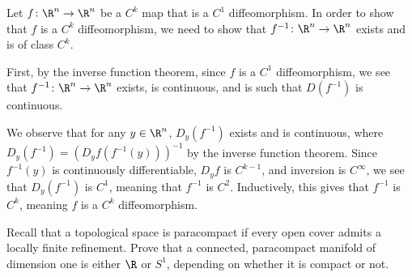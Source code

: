 \documentclass[10pt]{mypackage}
\begin{document}
\begin{solution}
  Let $f\colon \R^{n}\rightarrow \R^{n}$ be a $C^{k}$ map that is a $C^{1}$ diffeomorphism. In order to show that $f$ is a $C^{k}$ diffeomorphism, we need to show that $f^{-1}\colon \R^{n}\rightarrow \R^{n}$ exists and is of class $C^{k}$.\newline

  First, by the inverse function theorem, since $f$ is a $C^{1}$ diffeomorphism, we see that $f^{-1}\colon \R^{n}\rightarrow \R^{n}$ exists, is continuous, and is such that $D\left( f^{-1} \right)$ is continuous.\newline

  We observe that for any $y\in \R^{n}$, $D_y\left( f^{-1} \right)$ exists and is continuous, where $D_y\left( f^{-1} \right) = \left( D_yf\left( f^{-1}(y) \right) \right)^{-1}$ by the inverse function theorem. Since $f^{-1}(y)$ is continuously differentiable, $D_yf$ is $C^{k-1}$, and inversion is $C^{\infty}$, we see that $D_y\left( f^{-1} \right)$ is $C^{1}$, meaning that $f^{-1}$ is $C^{2}$. Inductively, this gives that $f^{-1}$ is $C^{k}$, meaning $f$ is a $C^{k}$ diffeomorphism.
\end{solution}
\begin{problem}[Problem 4]
  Recall that a topological space is paracompact if every open cover admits a locally finite refinement. Prove that a connected, paracompact manifold of dimension one is either $\R$ or $S^{1}$, depending on whether it is compact or not.
\end{problem}
\end{document}

